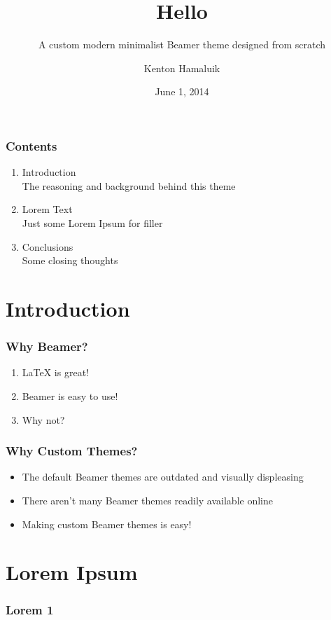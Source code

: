 \documentclass[aspectratio=169]{beamer}
\title{Hello}
\subtitle{A custom modern minimalist Beamer theme designed from scratch}
\author{Kenton Hamaluik}
\date{June 1, 2014}
\begin{document}
	\setcounter{showProgressBar}{0}
	\setcounter{showSlideNumbers}{0}

	\frame{\titlepage}

	\begin{frame}
		\frametitle{Contents}
		\begin{enumerate}
			\item Introduction \\ \textcolor{KauLightGray}{\footnotesize\hspace{1em} The reasoning and background behind this theme}
			\item Lorem Text  \\ \textcolor{KauLightGray}{\footnotesize\hspace{1em} Just some Lorem Ipsum for filler}
			\item Conclusions \\ \textcolor{KauLightGray}{\footnotesize\hspace{1em} Some closing thoughts}
		\end{enumerate}
	\end{frame}

	\setcounter{framenumber}{0}
	\setcounter{showProgressBar}{1}
	\setcounter{showSlideNumbers}{1}
	\section{Introduction}
		\begin{frame}
			\frametitle{Why Beamer?}
			\begin{enumerate}
				\item LaTeX is great!
				\item Beamer is easy to use!
				\item Why not?
			\end{enumerate}
		\end{frame}

		\begin{frame}
			\frametitle{Why Custom Themes?}
			\begin{itemize}
				\item The default Beamer themes are outdated and visually displeasing
				\item There aren't many Beamer themes readily available online
				\item Making custom Beamer themes is easy!
			\end{itemize}
		\end{frame}

	\section{Lorem Ipsum}
		\begin{frame}
			\frametitle{Lorem 1}
			\blindtext
		\end{frame}
\end{document}
